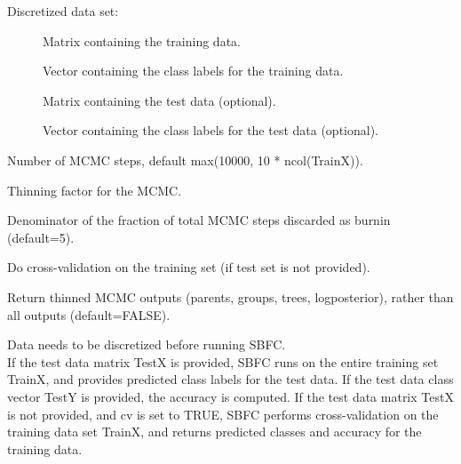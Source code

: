 \documentclass[a4paper]{book}
\begin{document}
\begin{Arguments}
\begin{ldescription}
\item[\code{data}] Discretized data set:
\begin{description}
     
\item[] Matrix containing the training data.
\item[] Vector containing the class labels for the training data.
\item[] Matrix containing the test data (optional).
\item[] Vector containing the class labels for the test data (optional).

\end{description}


\item[\code{nstep}] Number of MCMC steps, default max(10000, 10 * ncol(TrainX)).

\item[\code{thin}] Thinning factor for the MCMC.

\item[\code{burnin\_denom}] Denominator of the fraction of total MCMC steps discarded as burnin (default=5).

\item[\code{cv}] Do cross-validation on the training set (if test set is not provided).

\item[\code{thinoutputs}] Return thinned MCMC outputs (parents, groups, trees, logposterior), rather than all outputs (default=FALSE).
\end{ldescription}
\end{Arguments}
%
\begin{Details}\relax
Data needs to be discretized before running SBFC. \\{}
If the test data matrix TestX is provided, SBFC runs on the entire training set TrainX, and provides predicted class labels for the test data. 
If the test data class vector TestY is provided, the accuracy is computed. 
If the test data matrix TestX is not provided, and cv is set to TRUE, SBFC performs cross-validation on the training data set TrainX, 
and returns predicted classes and accuracy for the training data. \\{}
\end{Details}
%
\end{document}
